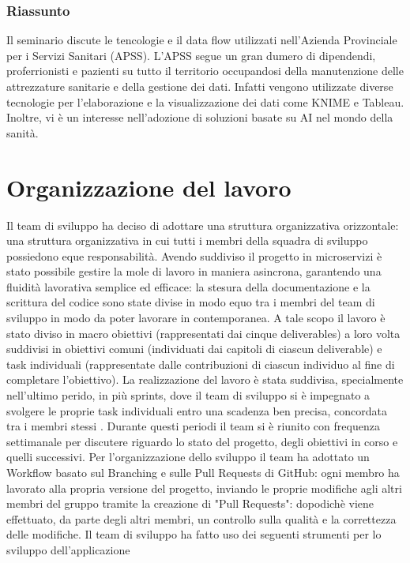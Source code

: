 \documentclass{report}
\begin{document}
\subsubsection*{Riassunto}
Il seminario discute le tencologie e il data flow utilizzati nell'Azienda Provinciale per i Servizi Sanitari (APSS). L'APSS segue un gran dumero di dipendendi, proferrionisti e pazienti su tutto il territorio occupandosi della manutenzione delle attrezzature sanitarie e della gestione dei dati. Infatti vengono utilizzate diverse tecnologie per l'elaborazione e la visualizzazione dei dati come KNIME e Tableau. Inoltre, vi è un interesse nell'adozione di soluzioni basate su AI nel mondo della sanità.

\section{Organizzazione del lavoro}

Il team di sviluppo ha deciso di adottare una struttura organizzativa orizzontale: una struttura organizzativa in cui tutti i membri della squadra di sviluppo possiedono eque responsabilità.
Avendo suddiviso il progetto in microservizi è stato possibile gestire la mole di lavoro in maniera asincrona, garantendo una fluidità lavorativa semplice ed efficace: la stesura della documentazione e la scrittura del codice sono state divise in modo equo tra i membri del team di sviluppo
in modo da poter lavorare in contemporanea.
A tale scopo il lavoro è stato diviso in macro obiettivi (rappresentati dai cinque deliverables) a loro volta suddivisi in obiettivi comuni (individuati dai capitoli di ciascun deliverable) e task individuali (rappresentate dalle contribuzioni di ciascun individuo al fine di completare l'obiettivo).
La realizzazione del lavoro è stata suddivisa, specialmente nell'ultimo perido, in più sprints, dove il team di sviluppo si è impegnato a svolgere le proprie task individuali entro una scadenza ben precisa, concordata tra i membri stessi . Durante questi periodi il team si è riunito con frequenza settimanale per discutere riguardo lo stato del progetto, degli obiettivi in corso e quelli successivi.
Per l'organizzazione dello sviluppo il team ha adottato un Workflow basato sul Branching e sulle Pull Requests di GitHub: ogni membro ha lavorato alla propria versione del progetto, inviando le proprie modifiche agli altri membri del gruppo tramite la creazione di "Pull Requests": dopodichè viene effettuato, da parte degli altri membri, un controllo sulla qualità e la correttezza delle modifiche.
Il team di sviluppo ha fatto uso dei seguenti strumenti per lo sviluppo dell'applicazione
\end{document}
